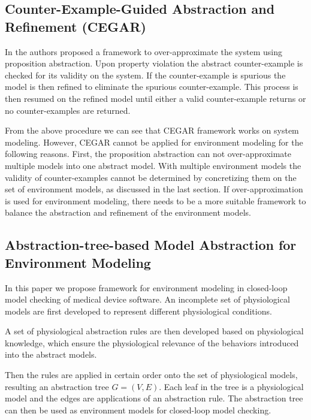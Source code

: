 \subsection{Counter-Example-Guided Abstraction and Refinement (CEGAR)}
In \cite{CEGAR} the authors proposed a framework to over-approximate the system using proposition abstraction. Upon property violation the abstract counter-example is checked for its validity on the system. If the counter-example is spurious the model is then refined to eliminate the spurious counter-example. This process is then resumed on the refined model until either a valid counter-example returns or no counter-examples are returned.

From the above procedure we can see that CEGAR framework works on system modeling. However, CEGAR cannot be applied for environment modeling for the following reasons. First, the proposition abstraction can not over-approximate multiple models into one abstract model. 
With multiple environment models the validity of counter-examples cannot be determined by concretizing them on the set of environment models, as discussed in the last section. If over-approximation is used for environment modeling, there needs to be a more suitable framework to balance the abstraction and refinement of the environment models.

\subsection{Abstraction-tree-based Model Abstraction for Environment Modeling}
In this paper we propose framework for environment modeling in closed-loop model checking of medical device software. An incomplete set of physiological models are first developed to represent different physiological conditions. 

A set of physiological abstraction rules are then developed based on physiological knowledge, which ensure the physiological relevance of the behaviors introduced into the abstract models. 

Then the rules are applied in certain order onto the set of physiological models, resulting an abstraction tree $G=(V,E)$. Each leaf in the tree is a physiological model and the edges are applications of an abstraction rule. The abstraction tree can then be used as environment models for closed-loop model checking.

